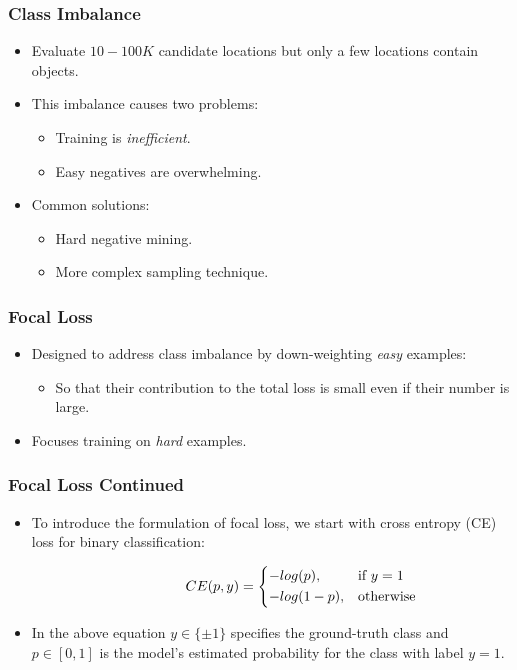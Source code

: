 \documentclass[10pt,fleqn,unknownkeysallowed]{beamer}
\begin{document}
\begin{frame}
	\frametitle{Class Imbalance}
	\linespread{1.5}
	\begin{itemize}
		\item{Evaluate $10 - 100K$ candidate locations but only a few locations contain objects.}
		\item{This imbalance causes two problems: }
		\begin{itemize}
			\item{Training is \textit{inefficient}.}
			\item{Easy negatives are overwhelming.}
		\end{itemize}
		\item{Common solutions:}
		\begin{itemize}
			\item{Hard negative mining.}
			\item{More complex sampling technique.}
		\end{itemize}
	\end{itemize}
\end{frame}


\begin{frame}
	\frametitle{Focal Loss}
	\linespread{1.5}
	\begin{itemize}
		\item{Designed to address class imbalance by down-weighting \textit{easy} examples:}
		\begin{itemize}
			\item{So that their contribution to the total loss is small even if their number is large.}
		\end{itemize}
		\item{Focuses training on \textit{hard} examples.}
	\end{itemize}
\end{frame}

\begin{frame}
	\frametitle{Focal Loss Continued}
	\begin{itemize}
		\item{To introduce the formulation of focal loss, we start with cross entropy (CE) loss for binary classification:}
	\end{itemize}
	\begin{center}
		\begin{align*}
		\quad \quad \quad \quad  \quad \quad
		CE(p,y)= 
		\begin{dcases}
		-log(p),& \text{if } y=1\\
		-log(1-p),              & \text{otherwise}
		\end{dcases}
		\end{align*}
	\end{center}
	\begin{itemize}
		\item{In the above equation $y \in \{\pm 1\}$ specifies the ground-truth class and $p \in [0, 1]$ is the model's estimated probability for the class with label $y=1$.}
	\end{itemize}
\end{frame}
\end{document}
